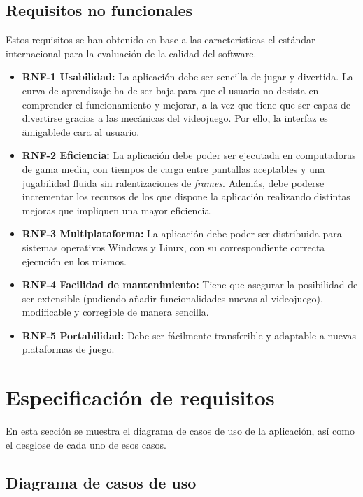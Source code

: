 \subsection{Requisitos no funcionales}

Estos requisitos se han obtenido en base a las características el estándar internacional para la evaluación de la calidad del software.

\begin{itemize}
\tightlist
\item 
	\textbf{RNF-1 Usabilidad:} La aplicación debe ser sencilla de jugar y divertida. La curva de aprendizaje ha de ser baja para que el usuario no desista en comprender el funcionamiento y mejorar, a la vez que tiene que ser capaz de divertirse gracias a las mecánicas del videojuego. Por ello, la interfaz es \"amigable\" de cara al usuario.

\item 
	\textbf{RNF-2 Eficiencia:} La aplicación debe poder ser ejecutada en computadoras de gama media, con tiempos de carga entre pantallas aceptables y una jugabilidad fluida sin ralentizaciones de \textit{frames}. Además, debe poderse incrementar los recursos de los que dispone la aplicación realizando distintas mejoras que impliquen una mayor eficiencia.
	
\item 
	\textbf{RNF-3 Multiplataforma:} La aplicación debe poder ser distribuida para sistemas operativos Windows y Linux, con su correspondiente correcta ejecución en los mismos. 
	
\item 
	\textbf{RNF-4 Facilidad de mantenimiento:} Tiene que asegurar la posibilidad de ser extensible (pudiendo añadir funcionalidades nuevas al videojuego), modificable y corregible de manera sencilla.

\item 
	\textbf{RNF-5 Portabilidad:} Debe ser fácilmente transferible y adaptable a nuevas plataformas de juego.

\end{itemize}
\section{Especificación de requisitos}

En esta sección se muestra el diagrama de casos de uso de la aplicación, así como el desglose de cada uno de esos casos.

\subsection{Diagrama de casos de uso}



